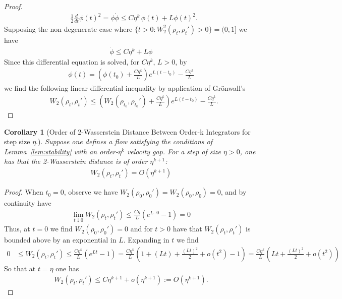 \documentclass[reqno,11pt,letterpaper]{amsart}
\theoremstyle{plain}
\newtheorem{corollary}{Corollary}
\theoremstyle{definition}
\theoremstyle{remark}
\begin{document}
\begin{proof}
\begin{align*}
    &\frac{1}{2}\frac{d}{dt} \phi(t)^{2} =  \phi \dot{\phi}
    \leq C\eta^{k} \,\phi(t) + L \phi(t)^{2} .
\end{align*}
Supposing the non-degenerate case where $\{ t>0 : W_{2}^{2} (\rho_{t}, \rho_{t}') > 0 \} = (0,1]$ we have
\begin{align*}
    \dot{\phi} \leq C\eta^{k} + L \phi
\end{align*}
Since this differential equation is solved, for $C\eta^{k} ,\,L > 0$, by 
\begin{align*}
    \phi(t) = \left(
    \phi(t_{0}) + \frac{C \eta^{k}}{L}
    \right)e^{L (t-t_{0})} - \frac{C\eta^{k}}{L}
\end{align*}
we find the following linear differential inequality by application of Gr\"{o}nwall's
\begin{align*}
    &W_{2} (\rho_{t}, \rho_{t}') \leq \left( W_{2} (\rho_{t_0}, \rho_{t_0}' )  + \frac{C\eta^{k}}{L} \right) e^{L(t-t_{0})} - \frac{C\eta^{k}}{L}.
\end{align*}
\end{proof}
\begin{corollary}[Order of 2-Wasserstein Distance Between Order-k Integrators for step size $\eta$.]\label{cor:W2_order_2_distance}
    Suppose one defines a flow satisfying the conditions of Lemma~\ref{lem:stability} with an order-$\eta^{k}$ velocity gap. For a step of size $\eta >0$, one has that the 2-Wasserstein distance is of order $\eta^{k+1}$:
    \begin{align}
        W_{2} (\rho_{t}, \rho_{t}') = O(\eta^{k+1})
    \end{align}
\end{corollary}
\begin{proof}
    When $t_{0}=0$, observe we have $W_{2} (\rho_{0}, \rho_{0}' )= W_{2} (\rho_{0},\rho_{0}) = 0$, and by continuity have
\begin{align*}
    \lim_{t \downarrow 0} W_{2}(\rho_{t}, \rho_{t}') \leq  \frac{C\eta}{L} (e^{L\cdot0} - 1) = 0
\end{align*}
Thus, at $t=0$ we find $W_{2} (\rho_{0}, \rho_{0}') = 0$ and for $t>0$ have that $W_{2} (\rho_{t}, \rho_{t}')$ is bounded above by an exponential in $L$. Expanding in $t$ we find
\begin{align*}
    0 &\leq W_{2} (\rho_{t}, \rho_{t}') \leq  \frac{C\eta^{k}}{L} (e^{Lt} - 1) = \frac{C\eta^{k}}{L} (1 + (Lt) + \frac{(Lt)^{2}}{2} + o(t^{2}) - 1) = \frac{C \eta^{k}}{L}(Lt + \frac{(Lt)^{2}}{2} + o(t^{2}))
\end{align*}
So that at $t=\eta$ one has
\begin{align*}
    W_{2} (\rho_{t}, \rho_{t}') \leq C \eta^{k+1} + o(\eta^{k+1}):= O(\eta^{k+1}).
\end{align*}
\end{proof}
\end{document}
